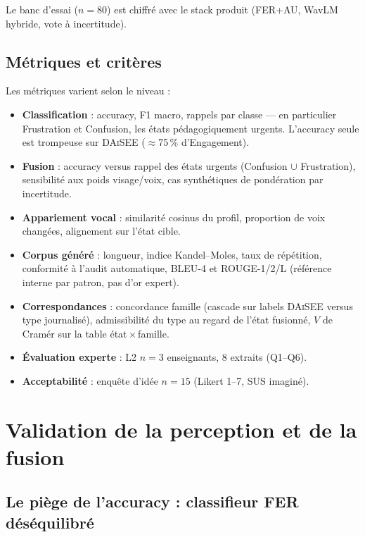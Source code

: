 Le banc d'essai ($n=80$) est chiffré avec le stack produit
(FER+AU, WavLM hybride, vote à incertitude).

\subsection{Métriques et critères}

Les métriques varient selon le niveau :

\begin{itemize}[leftmargin=1.4em]
  \item \textbf{Classification} : accuracy, F1 macro, rappels par classe
  --- en particulier Frustration et Confusion, les états pédagogiquement
  urgents. L'accuracy seule est trompeuse sur \textsc{DAiSEE} ($\approx$75\,\%
  d'Engagement).
  \item \textbf{Fusion} : accuracy versus rappel des états urgents
  (Confusion $\cup$ Frustration), sensibilité aux poids visage/voix, 
  cas synthétiques de pondération par incertitude.
  \item \textbf{Appariement vocal} : similarité cosinus du profil,
  proportion de voix changées, alignement sur l'état cible.
  \item \textbf{Corpus généré} : longueur, indice Kandel--Moles, taux de
  répétition, conformité à l'audit automatique, BLEU-4 et ROUGE-1/2/L
  (référence interne par patron, pas d'or expert).
  \item \textbf{Correspondances} : concordance famille (cascade sur
  labels \textsc{DAiSEE} versus type journalisé), admissibilité du type
  au regard de l'état fusionné, $V$ de Cramér sur la table
  état\,$\times$\,famille.
  \item \textbf{Évaluation experte} : L2 $n=3$ enseignants, 8 extraits
  (Q1--Q6).
  \item \textbf{Acceptabilité} : enquête d'idée $n=15$ (Likert 1--7, SUS
  imaginé).
\end{itemize}

\section{Validation de la perception et de la fusion}
\label{sec:val-perception}

\subsection{Le piège de l'accuracy : classifieur FER déséquilibré}
\label{subsec:val-fer-collapse}

